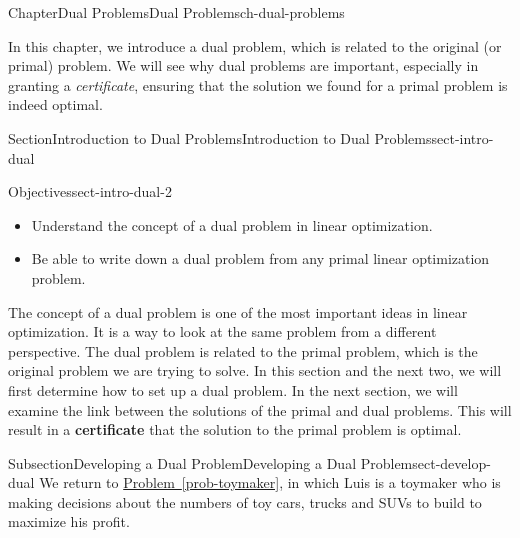 \documentclass[oneside,10pt,]{book}
\newcommand{\xreffont}{\relax}
\newcommand{\terminology}[1]{\textbf{#1}}
\numberwithin{equation}{section}
\begin{document}
%
%
\typeout{************************************************}
\typeout{************************************************}
%
\begin{chapterptx}{Chapter}{Dual Problems}{}{Dual Problems}{}{}{ch-dual-problems}
\renewcommand*{\chaptername}{Chapter}
\begin{introduction}{}%
In this chapter, we introduce a dual problem, which is related to the original (or primal) problem.  We will see why dual problems are important, especially in granting a \emph{certificate}, ensuring that the solution we found for a primal problem is indeed optimal.%
\end{introduction}%
%
%
\typeout{************************************************}
\typeout{************************************************}
%
\begin{sectionptx}{Section}{Introduction to Dual Problems}{}{Introduction to Dual Problems}{}{}{sect-intro-dual}
\begin{objectives}{Objectives}{sect-intro-dual-2}
%
\begin{itemize}[label=\textbullet]
\item{}Understand the concept of a dual problem in linear optimization.%
\item{}Be able to write down a dual problem from any primal linear optimization problem.%
\end{itemize}
\end{objectives}
\begin{introduction}{}%
The concept of a dual problem is one of the most important ideas in linear optimization. It is a way to look at the same problem from a different perspective. The dual problem is related to the primal problem, which is the original problem we are trying to solve. In this section and the next two, we will first determine how to set up a dual problem. In the next section, we will examine the link between the solutions of the primal and dual problems. This will result in a \terminology{certificate} that the solution to the primal problem is optimal.%
\end{introduction}%
%
%
\typeout{************************************************}
\typeout{************************************************}
%
\begin{subsectionptx}{Subsection}{Developing a Dual Problem}{}{Developing a Dual Problem}{}{}{sect-develop-dual}
We return to \hyperref[prob-toymaker]{Problem~{\xreffont\ref{prob-toymaker}}}, in which Luis is a toymaker who is making decisions about the numbers of toy cars, trucks and SUVs to build to maximize his profit.%

\end{subsectionptx}
\end{sectionptx}
\end{chapterptx}
\end{document}
